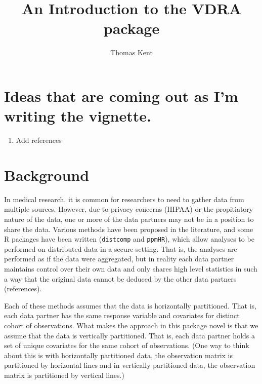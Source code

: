 \documentclass[12]{article}
\title{An Introduction to the VDRA package}
\author{Thomas Kent}
\begin{document}
\maketitle


\section{Ideas that are coming out as I'm writing the vignette.}
\begin{enumerate}
	\item Add references

	
\end{enumerate}

\section{Background}

In medical research, it is common for researchers to need to gather data from multiple sources.  However, due to privacy concerns (HIPAA) or the propitiatory nature of the data, one or more of the data partners may not be in a position to share the data.  Various methods have been proposed in the literature, and some R packages have been written (\verb"distcomp" and \verb"ppmHR"), which allow analyses to be performed on distributed data in a secure setting.  That is, the analyses are performed as if the data were aggregated, but in reality each data partner maintains control over their own data and only shares high level statistics in such a way that the original data cannot be deduced by the other data partners (references).  

Each of these methods assumes that the data is horizontally partitioned.  That is, each data partner has the same response variable and covariates for distinct cohort of observations.  What makes the approach in this package novel is that we assume that the data is vertically partitioned.  That is, each data partner holds a set of unique covariates for the same cohort of observations.  (One way to think about this is with horizontally partitioned data, the observation matrix is partitioned by horizontal lines and in vertically partitioned data, the observation matrix is partitioned by vertical lines.)
\end{document}
